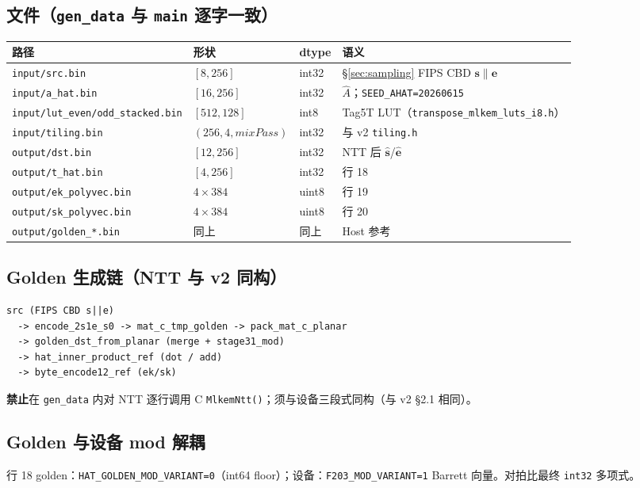 \documentclass[UTF8,a4paper,11pt]{ctexart}
\begin{document}
\subsection{文件（\texttt{gen\_data} 与 \texttt{main} 逐字一致）}
\begin{longtable}{@{}L{3.8cm}lll@{}}
\toprule
路径 & 形状 & dtype & 语义 \\
\midrule
\texttt{input/src.bin} & $[8,256]$ & int32 & §\ref{sec:sampling} FIPS CBD $\mathbf{s}\|\mathbf{e}$ \\
\texttt{input/a\_hat.bin} & $[16,256]$ & int32 & $\widehat{A}$；\texttt{SEED\_AHAT=20260615} \\
\texttt{input/lut\_even/odd\_stacked.bin} & $[512,128]$ & int8 & Tag5T LUT（\texttt{transpose\_mlkem\_luts\_i8.h}） \\
\texttt{input/tiling.bin} & $(256,4,\mathit{mixPass})$ & int32 & 与 v2 \texttt{tiling.h} \\
\texttt{output/dst.bin} & $[12,256]$ & int32 & NTT 后 $\hat{\mathbf{s}}$/$\hat{\mathbf{e}}$ \\
\texttt{output/t\_hat.bin} & $[4,256]$ & int32 & 行 18 \\
\texttt{output/ek\_polyvec.bin} & $4{\times}384$ & uint8 & 行 19 \\
\texttt{output/sk\_polyvec.bin} & $4{\times}384$ & uint8 & 行 20 \\
\texttt{output/golden\_*.bin} & 同上 & 同上 & Host 参考 \\
\bottomrule
\end{longtable}

\subsection{Golden 生成链（NTT 与 v2 同构）}
\begin{verbatim}
src (FIPS CBD s||e)
  -> encode_2s1e_s0 -> mat_c_tmp_golden -> pack_mat_c_planar
  -> golden_dst_from_planar (merge + stage31_mod)
  -> hat_inner_product_ref (dot / add)
  -> byte_encode12_ref (ek/sk)
\end{verbatim}
\textbf{禁止}在 \texttt{gen\_data} 内对 NTT 逐行调用 C \texttt{MlkemNtt()}；须与设备三段式同构（与 v2 §2.1 相同）。

\subsection{Golden 与设备 mod 解耦}
行 18 golden：\texttt{HAT\_GOLDEN\_MOD\_VARIANT=0}（int64 floor）；设备：\texttt{F203\_MOD\_VARIANT=1} Barrett 向量。对拍比最终 \texttt{int32} 多项式。
\end{document}
